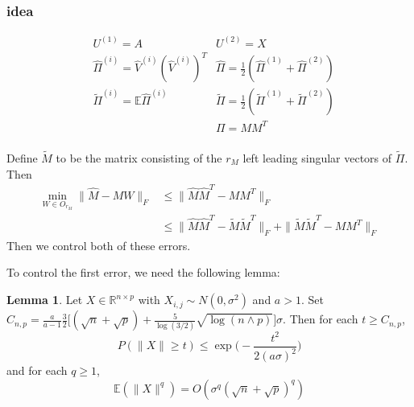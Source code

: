 \documentclass[notheorems]{beamer}
\theoremstyle{definition}
\newtheorem{lem}[definition]{Lemma}
\begin{document}
\begin{frame}
\frametitle{idea}
\begin{align*}
    & U^{(1)} = A & U^{(2)} = X \\
    &\hat{\Pi}^{(i)} =  \hat{V}^{(i)}(\hat{V}^{(i)})^T  &\hat{\Pi} = \frac{1}{2}(\hat{\Pi}^{(1)} + \hat{\Pi}^{(2)}) \\
    &\tilde{\Pi}^{(i)} = \mathbb{E}\hat{\Pi}^{(i)}   &\tilde{\Pi} = \frac{1}{2}(\tilde{\Pi}^{(1)} + \tilde{\Pi}^{(2)}) \\ 
    &  & \Pi = MM^T \\
\end{align*}
\end{frame}














\begin{frame}
Define $\tilde{M}$ to be the matrix consisting of the $r_M$ left leading singular vectors of $\tilde{\Pi}$. Then 
\begin{align*}
    \min_{W \in O_{r_M}} \|\hat{M} - MW\|_F 
    & \leq \|\hat{M}\hat{M}^T - MM^T\|_F \\
    & \leq \|\hat{M}\hat{M}^T - \tilde{M}\tilde{M}^T\|_F + \|\tilde{M}\tilde{M}^T - MM^T\|_F
\end{align*}
Then we control both of these errors.
\end{frame}










\begin{frame}
To control the first error, we need the following lemma:
\begin{lem}
Let $X \in \mathbb{R}^{n \times p}$ with $X_{i,j} \sim N(0, \sigma^2)$ and $a > 1$. Set $C_{n,p} = \frac{a}{a-1}\frac{3}{2}\bigg[(\sqrt{n} + \sqrt{p}) + \frac{5}{\log{(3/2)}} \sqrt{\log{(n \wedge p)}} \bigg]\sigma$. Then for each $t \geq  C_{n,p}$, 
\begin{equation*}
    P(\|X\| \geq t) \leq \exp \bigg(-\frac{t^2}{2(a \sigma)^2} \bigg)
\end{equation*}
and for each $q \geq 1$,
\begin{equation*}
    \mathbb{E}(\|X\|^q) = O(\sigma^q(\sqrt{n} + \sqrt{p})^q)
\end{equation*}
\end{lem} 
\end{frame}
\end{document}
